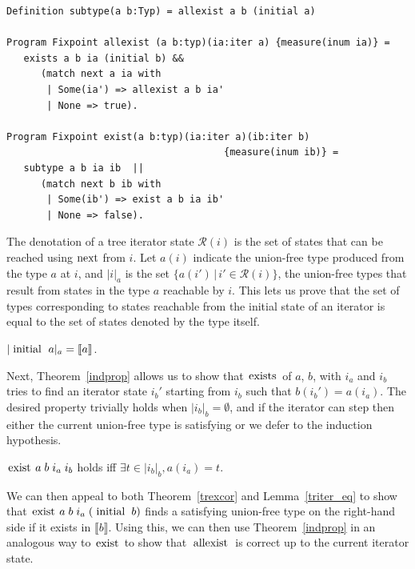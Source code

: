 \documentclass[a4paper,english]{lipics-v2019}
\newcommand{\denotes}[1]{\llbracket #1 \rrbracket}
\renewcommand{\c}[1]{\ensuremath{\text{\lstinline{#1}}}\xspace}
\begin{document}
\begin{lstlisting}
Definition subtype(a b:Typ) = allexist a b (initial a)

Program Fixpoint allexist (a b:typ)(ia:iter a) {measure(inum ia)} =
   exists a b ia (initial b) && 
      (match next a ia with 
       | Some(ia') => allexist a b ia' 
       | None => true).

Program Fixpoint exist(a b:typ)(ia:iter a)(ib:iter b)
                                      {measure(inum ib)} =
   subtype a b ia ib  || 
      (match next b ib with 
       | Some(ib') => exist a b ia ib' 
       | None => false).
\end{lstlisting}

\newcommand{\irdn}[1]{\ensuremath{\mathcal{R}({#1})}}
\newcommand{\irch}[2]{\ensuremath{|#1|_{#2}}}

\noindent
The denotation of a tree iterator state $\irdn{i}$ is the set of states that
can be reached using \c{next} from $i$. Let $a(i)$ indicate the union-free
type produced from the type $a$ at $i$, and \irch{i}{a} is the set
$\{a(i')\,|\,i'\in\irdn{i}\}$, the union-free types that result from states
in the type $a$ reachable by $i$.  This lets us prove that the set of types
corresponding to states reachable from the initial state of an iterator is
equal to the set of states denoted by the type itself.

\begin{lemma}\label{triter_eq}
$\irch{\c{initial}~a}{a} = \denotes{a}$.
\end{lemma}

\noindent
Next, Theorem~\ref{indprop} allows us to show that \c{exists} of $a$, $b$,
with $i_a$ and $i_b$  tries to find an iterator state $i_b'$ starting from
$i_b$ such that $b(i_b') = a(i_a)$. The desired property trivially holds
when $\irch{i_b}{b} = \emptyset$, and if the iterator can step then either
the current union-free type is satisfying or we defer to the induction
hypothesis.


\begin{theorem}\label{trexcor}
$\c{exist}\;a\;b\;i_a\;i_b$ holds iff $\exists t\in\irch{i_b}{b},a(i_a)= t$.
\end{theorem}

\noindent
We can then appeal to both Theorem~\ref{trexcor} and Lemma~\ref{triter_eq}
to show that $\c{exist}\;a\;b\;i_a\;(\c{initial}\;b)$ finds a satisfying
union-free type on the right-hand side if it exists in $\denotes{b}$. Using
this, we can then use Theorem~\ref{indprop} in an analogous way to \c{exist}
to show that \c{allexist} is correct up to the current iterator state.
\end{document}
